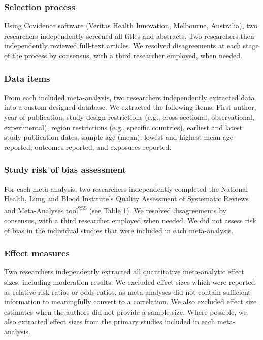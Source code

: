 \documentclass[
  english,
  man]{apa6}
\begin{document}
\hypertarget{selection-process}{%
\subsubsection{Selection process}\label{selection-process}}

Using Covidence software (Veritas Health Innovation, Melbourne, Australia), two researchers independently screened all titles and abstracts.
Two researchers then independently reviewed full-text articles.
We resolved disagreements at each stage of the process by consensus, with a third researcher employed, when needed.

\hypertarget{data-items}{%
\subsubsection{Data items}\label{data-items}}

From each included meta-analysis, two researchers independently extracted data into a custom-designed database.
We extracted the following items: First author, year of publication, study design restrictions (e.g., cross-sectional, observational, experimental), region restrictions (e.g., specific countries), earliest and latest study publication dates, sample age (mean), lowest and highest mean age reported, outcomes reported, and exposures reported.

\hypertarget{study-risk-of-bias-assessment}{%
\subsubsection{Study risk of bias assessment}\label{study-risk-of-bias-assessment}}

For each meta-analysis, two researchers independently completed the National Health, Lung and Blood Institute's Quality Assessment of Systematic Reviews and Meta-Analyses tool\textsuperscript{255} (see Table 1).
We resolved disagreements by consensus, with a third researcher employed when needed.
We did not assess risk of bias in the individual studies that were included in each meta-analysis.

\hypertarget{effect-measures}{%
\subsubsection{Effect measures}\label{effect-measures}}

Two researchers independently extracted all quantitative meta-analytic effect sizes, including moderation results.
We excluded effect sizes which were reported as relative risk ratios or odds ratios, as meta-analyses did not contain sufficient information to meaningfully convert to a correlation.
We also excluded effect size estimates when the authors did not provide a sample size.
Where possible, we also extracted effect sizes from the primary studies included in each meta-analysis.
\end{document}
